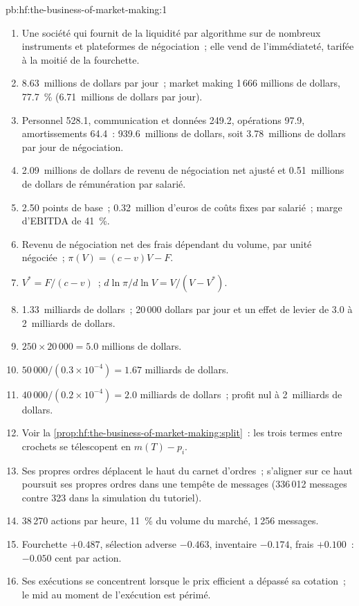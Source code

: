 \begin{solution}{pb:hf:the-business-of-market-making:1}
\begin{enumerate}
\item Une société qui fournit de la liquidité par algorithme sur de nombreux instruments et plateformes de négociation~; elle vend de l'immédiateté, tarifée à la moitié de la fourchette.
\item 8.63~millions de dollars par jour~; market making 1\,666 millions de dollars, 77.7~\% (6.71~millions de dollars par jour).
\item Personnel 528.1, communication et données 249.2, opérations 97.9, amortissements 64.4~: 939.6~millions de dollars, soit 3.78~millions de dollars par jour de négociation.
\item 2.09~millions de dollars de revenu de négociation net ajusté et 0.51~millions de dollars de rémunération par salarié.
\item 2.50 points de base~; 0.32~million d'euros de coûts fixes par salarié~; marge d'EBITDA de 41~\%.
\item Revenu de négociation net des frais dépendant du volume, par unité négociée~; $\pi(V)=(c-v)V-F$.
\item $V^\ast=F/(c-v)$~; $d\ln\pi/d\ln V=V/(V-V^\ast)$.
\item 1.33~milliards de dollars~; 20\,000 dollars par jour et un effet de levier de 3.0 à 2~milliards de dollars.
\item $250\times20\,000=5.0$ millions de dollars.
\item $50\,000/(0.3\times10^{-4})=1.67$ milliards de dollars.
\item $40\,000/(0.2\times10^{-4})=2.0$ milliards de dollars~; profit nul à 2~milliards de dollars.
\item Voir la \cref{prop:hf:the-business-of-market-making:split}~: les trois termes entre crochets se télescopent en $m(T)-p_i$.
\item Ses propres ordres déplacent le haut du carnet d'ordres~; s'aligner sur ce haut poursuit ses propres ordres dans une tempête de messages (336\,012 messages contre 323 dans la
simulation du tutoriel).
\item 38\,270 actions par heure, 11~\% du volume du marché, 1\,256 messages.
\item Fourchette $+0.487$, sélection adverse $-0.463$, inventaire $-0.174$, frais $+0.100$~: $-0.050$ cent par action.
\item Ses exécutions se concentrent lorsque le prix efficient a dépassé sa cotation~; le mid au moment de l'exécution est périmé.

\end{enumerate}
\end{solution}
